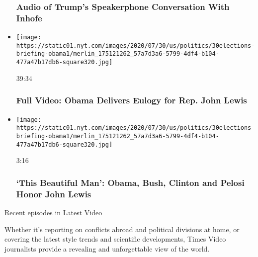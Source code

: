 \begin{itemize}
  \hypertarget{audio-of-trumps-speakerphone-conversation-with-inhofe}{%
  \subsubsection{Audio of Trump's Speakerphone Conversation With
  Inhofe}\label{audio-of-trumps-speakerphone-conversation-with-inhofe}}
\item
  \href{https://www.nytimes.com/video/us/100000007264733/obama-john-lewis-funeral.html?action=click\&module=video-series-bar\&region=header\&pgtype=Article\&playlistId=video/latest-video}{}

  \texttt{[image: https://static01.nyt.com/images/2020/07/30/us/politics/30elections-briefing-obama1/merlin\_175121262\_57a7d3a6-5799-4df4-b104-477a47b17db6-square320.jpg]}

  39:34

  \hypertarget{full-video-obama-delivers-eulogy-for-rep-john-lewis}{%
  \subsubsection{Full Video: Obama Delivers Eulogy for Rep. John
  Lewis}\label{full-video-obama-delivers-eulogy-for-rep-john-lewis}}
\item
  \href{https://www.nytimes.com/video/us/politics/100000007264823/john-lewis-funeral.html?action=click\&module=video-series-bar\&region=header\&pgtype=Article\&playlistId=video/latest-video}{}

  \texttt{[image: https://static01.nyt.com/images/2020/07/30/us/politics/30elections-briefing-obama1/merlin\_175121262\_57a7d3a6-5799-4df4-b104-477a47b17db6-square320.jpg]}

  3:16

  \hypertarget{this-beautiful-man-obama-bush-clinton-and-pelosi-honor-john-lewis}{%
  \subsubsection{`This Beautiful Man': Obama, Bush, Clinton and Pelosi
  Honor John
  Lewis}\label{this-beautiful-man-obama-bush-clinton-and-pelosi-honor-john-lewis}}
\end{itemize}

Recent episodes in Latest Video

Whether it's reporting on conflicts abroad and political divisions at
home, or covering the latest style trends and scientific developments,
Times Video journalists provide a revealing and unforgettable view of
the world.

